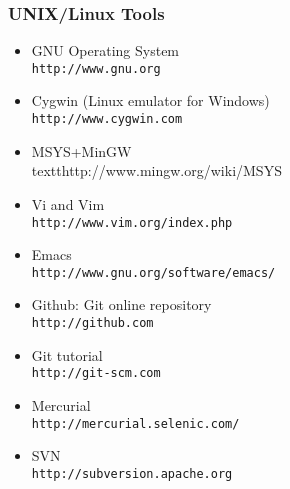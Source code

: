\documentclass[ChapterTOCs,krantz2]{krantz} %
\begin{document}
\subsubsection{UNIX/Linux Tools}
\begin{itemize}
\item GNU Operating System\\\texttt{http://www.gnu.org}
\item Cygwin (Linux emulator for Windows)\\\texttt{http://www.cygwin.com}
\item MSYS+MinGW \\textt{http://www.mingw.org/wiki/MSYS}

\item Vi and Vim\\ \texttt{http://www.vim.org/index.php}
\item Emacs\\ \texttt{http://www.gnu.org/software/emacs/}
\item Github: Git online repository\\ \texttt{http://github.com}
\item Git tutorial \\\texttt{http://git-scm.com}
\item Mercurial \\\texttt{http://mercurial.selenic.com/}
\item SVN \\\texttt{http://subversion.apache.org}
\end{itemize}
\end{document}
